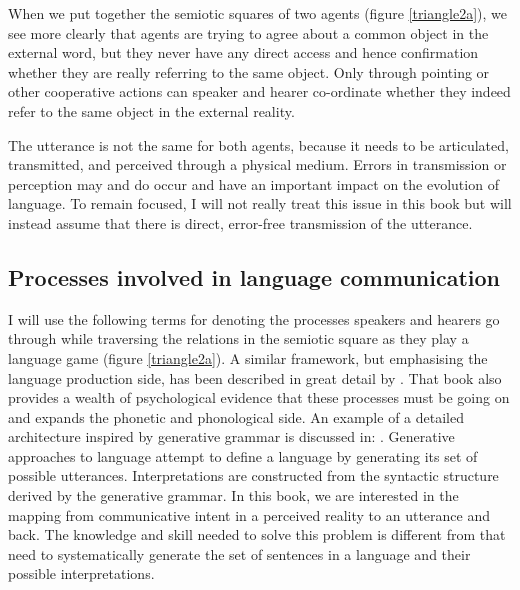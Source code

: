 When we put together the semiotic squares of two 
agents (figure \ref{triangle2a}), we see more clearly 
that agents are trying to agree about a common object
in the external word, but they never have 
any direct access and hence confirmation whether they 
are really referring to the same object. 
Only through pointing or other
cooperative actions can speaker and hearer co-ordinate
whether they indeed refer to the same object in
the external reality. 

The utterance is not the same for both agents, because it
needs to be articulated, transmitted, and perceived through 
a physical medium. Errors in transmission or perception may 
and do occur and have an important impact on the evolution of 
language. To remain focused, I will not really treat this issue in 
this book but will instead assume that there is direct, error-free transmission
of the utterance. 

\subsection{Processes involved in language communication}

I will use the following terms for denoting the 
processes speakers and hearers go through while traversing
the relations in the semiotic square as they play a language
game (figure \ref{triangle2a}). 
A similar framework, but emphasising the 
language production side, has been described in great
detail by \cite{Levelt:1989}. That book also provides a wealth
of psychological evidence that these processes must 
be going on and expands the phonetic and phonological 
side. An example of a detailed architecture inspired by 
generative grammar is discussed in: \cite{Jackendoff:1997}. 
Generative approaches to language attempt to define a language by 
generating its set of possible utterances. Interpretations
are constructed from the syntactic structure derived by 
the generative grammar. In this book, we are interested 
in the mapping from communicative intent 
in a perceived reality to an utterance and back. The knowledge
and skill needed to solve this problem is different from 
that need to systematically generate the set of sentences in a 
language and their possible interpretations.

